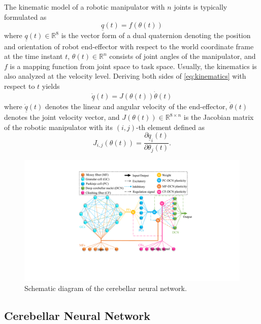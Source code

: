\documentclass[journal,twoside,web]{ieeecolor}
\begin{document}
The kinematic model of a robotic manipulator with $n$ joints is typically formulated as
\begin{equation}
\underline{q}(t) = f(\theta(t))
\label{eq:kinematics}
\end{equation}
where $\underline{q}(t) \in \mathbb{R}^8$ is the vector form of a dual quaternion denoting the position and orientation of robot end-effector with respect to the world coordinate frame at the time instant $t$, $\theta(t) \in \mathbb{R}^n$ consists of joint angles of the manipulator, and $f$ is a mapping function from joint space to task space.  Usually, the kinematics is also analyzed at the velocity level. Deriving both sides of \eqref{eq:kinematics} with respect to $t$ yields
\begin{equation}
\dot{{\underline{q}}}(t) = J(\theta(t)) \dot{\theta}(t)
\label{eq:velKinematics}
\end{equation}
where $\dot{{\underline{q}}}(t)$ denotes the linear and angular velocity of the end-effector, $\dot{\theta}(t)$ denotes the joint velocity vector, and $J(\theta(t)) \in \mathbb{R}^{8\times n}$ is the Jacobian matrix of the robotic manipulator with its $(i,j)$-th element defined as
\begin{equation}
J_{i,j}(\theta(t)) = \frac{\partial {\underline{q}}_i(t)}{\partial \theta_j(t)}.
\label{eq:Jacobian}
\end{equation}


\begin{figure}[!t]
    \centering
    \includegraphics[width=0.8\linewidth]{figures/FIG1_TII-24-5492.pdf}
    \caption{Schematic diagram of the cerebellar neural network.
    }
    \label{Fig:Cerebellum}
\end{figure}
\subsection{Cerebellar Neural Network}
\end{document}
